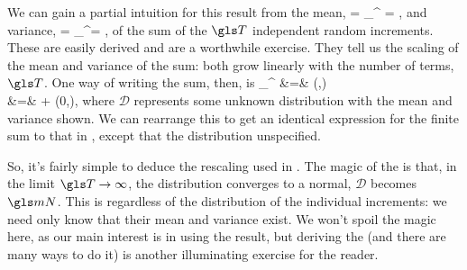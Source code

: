 We can gain a partial intuition for this result from the mean,
\be
{} = \sum_{}^\T \ave{\d\gv_\gtau} = \T \ave{\d\gv},
\ee
and variance,
\be
\var\left[\sum_{\gtau=1}^\T \d\gv_\gtau\right] = \sum_{}^\T \var\left[\d\gv_\gtau\right] = \T \var[\d\gv],
\ee
of the sum of the $\T$ independent random increments. These are easily derived and are a worthwhile exercise. They tell us the scaling of the mean and variance of the sum: both grow linearly with the number of terms, $\T$. One way of writing the sum, then, is
\bea
\sum_{}^\T \ave{\d\gv_\gtau} &=& (\T \ave{\d\gv},\T \var[\d\gv]) \\
&=& \T \ave{\d\gv} +  (0,\var[\d\gv]),
\eea
where $\mathcal{D}$ represents some unknown distribution with the mean and variance shown. We can rearrange this to get an identical expression for the finite sum to that in , except that the distribution unspecified.

So, it's fairly simple to deduce the rescaling used in . The magic of the \CLT is that, in the limit $\T\to\infty$, the distribution converges to a normal, \ie $\mathcal{D}$ becomes $\mN$. This is regardless of the distribution of the individual increments: we need only know that their mean and variance exist. We won't spoil the magic here, as our main interest is in using the result, but deriving the \CLT (and there are many ways to do it) is another illuminating exercise for the reader.

%
%
%

